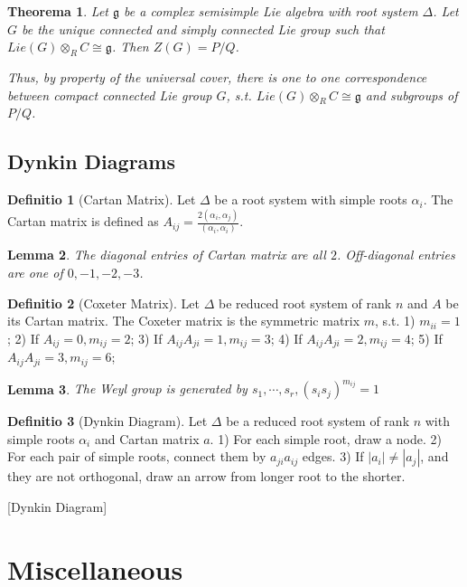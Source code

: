 \documentclass[12pt, a4paper]{article}
\newtheorem{theorem}{Theorema}[section]
\newtheorem{lemma}[theorem]{Lemma}
\theoremstyle{definition}
\newtheorem{definition}{Definitio}[section]
\theoremstyle{remark}
\newcommand{\mf}[1]{\mathfrak{#1}}
\begin{document}
\begin{theorem}
	Let $\mf{g}$ be a complex semisimple Lie algebra with root system $\Delta$.
Let $G$ be the unique connected and simply connected Lie group such that $Lie(G) \otimes_R C \cong \mf{g}$.
Then $Z(G) = P/Q$.

Thus, by property of the universal cover, there is one to one correspondence between compact connected Lie group $G$, s.t. $Lie(G) \otimes_R C \cong \mf{g}$ and subgroups of $P/Q$.
\end{theorem}

\subsection{Dynkin Diagrams}

\begin{definition}[Cartan Matrix]
	Let $\Delta$ be a root system with simple roots $\alpha_i$. 
	The Cartan matrix is defined as $A_{ij} = \frac{2(\alpha_i, \alpha_j)}{(\alpha_i, \alpha_i)}$.
\end{definition}

\begin{lemma}
	The diagonal entries of Cartan matrix are all $2$. Off-diagonal entries are one of $0, -1, -2, -3$.
\end{lemma}

\begin{definition}[Coxeter Matrix]
	Let $\Delta$ be reduced root system of rank $n$ and $A$ be its Cartan matrix.	
	The Coxeter matrix is the symmetric matrix $m$, s.t.
	1) $m_{ii} = 1$;
	2) If $A_{ij} = 0, m_{ij} =2$;
	3) If $A_{ij}A_{ji} = 1, m_{ij} = 3 $;
	4) If $A_{ij}A_{ji} = 2, m_{ij} = 4 $;
	5) If $A_{ij}A_{ji} = 3, m_{ij} = 6 $;
\end{definition}

\begin{lemma}
	The Weyl group is generated by $s_1, \cdots, s_r, (s_is_j)^{m_{ij}} = 1$
\end{lemma}

\begin{definition}[Dynkin Diagram]
	Let $\Delta$ be a reduced root system of rank $n$ with simple roots $\alpha_i$ and Cartan matrix $a$.
	1) For each simple root, draw a node.
	2) For each pair of simple roots, connect them by $a_{ji}a_{ij}$ edges.
	3) If $|a_i| \neq |a_j|$, and they are not orthogonal, draw an arrow from longer root to the shorter.
\end{definition}[Dynkin Diagram]

\section{Miscellaneous}
\end{document}
